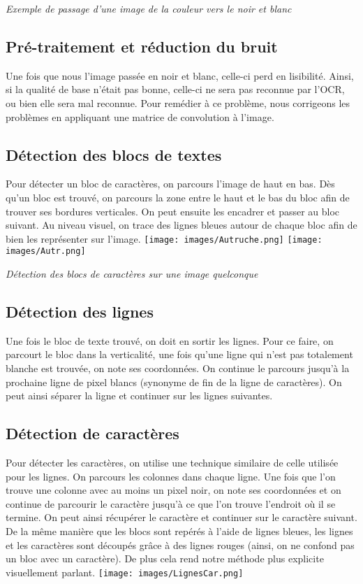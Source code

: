 \documentclass[14pt]{article}
\begin{document}
\textit{Exemple de passage d'une image de la couleur vers le noir et blanc}
\indent
\subsection{Pré-traitement et réduction du bruit}
Une fois que nous l'image passée en noir et blanc, celle-ci perd en lisibilité. Ainsi, si la qualité de base n'était pas bonne, celle-ci ne sera pas reconnue par l'OCR, ou bien elle sera mal reconnue. Pour remédier à ce problème, nous corrigeons les problèmes en appliquant une matrice de convolution à l'image. \indent 
\newpage

\subsection{Détection des blocs de textes}
Pour détecter un bloc de caractères, on parcours l'image de haut en bas. Dès qu'un bloc est trouvé, on parcours la zone entre le haut et le bas du bloc afin de trouver ses bordures verticales. On peut ensuite les encadrer et passer au bloc suivant. Au niveau visuel, on trace des lignes bleues autour de chaque bloc afin de bien les représenter sur l'image.
\newline
\newline
\noindent
\texttt{[image: images/Autruche.png]}
\texttt{[image: images/Autr.png]}

\textit{Détection des blocs de caractères sur une image quelconque}
\indent 
\newpage
\subsection{Détection des lignes}
Une fois le bloc de texte trouvé, on doit en sortir les lignes. Pour ce faire, on parcourt le bloc dans la verticalité, une fois qu'une ligne qui n'est pas totalement blanche est trouvée, on note ses coordonnées. On continue le parcours jusqu'à la prochaine ligne de pixel blancs (synonyme de fin de la ligne de caractères). On peut ainsi séparer la ligne et continuer sur les lignes suivantes.
\indent
\subsection{Détection de caractères}
Pour détecter les caractères, on utilise une technique similaire de celle utilisée pour les lignes. On parcours les colonnes dans chaque ligne. Une fois que l'on trouve une colonne avec au moins un pixel noir, on note ses coordonnées et on continue de parcourir le caractère jusqu'à ce que l'on trouve l'endroit où il se termine. On peut ainsi récupérer le caractère et continuer sur le caractère suivant. De la même manière que les blocs sont repérés à l'aide de lignes bleues, les lignes et les caractères sont découpés grâce à des lignes rouges (ainsi, on ne confond pas un bloc avec un caractère). De plus cela rend notre méthode plus explicite visuellement parlant. 
\newline
\newpage
\noindent
\texttt{[image: images/LignesCar.png]}
\end{document}
